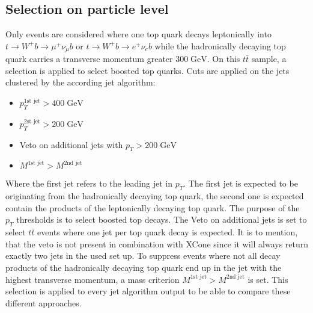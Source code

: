 \subsection{Selection on particle level}
\label{sec:GenSel}
	Only events are considered where one top quark decays leptonically into $t\rightarrow W^{+} b\rightarrow \mu^{+} \nu_{\mu} b$ or $t\rightarrow W^{+} b\rightarrow e^{+} \nu_e b$ while the hadronically decaying top quark carries a transverse momentum greater $300\;\text{GeV}$. On this $t\bar{t}$ sample, a selection is applied to select boosted top quarks. Cuts are applied on the jets clustered by the according jet algorithm:
	\begin{itemize}
	\item $p_T^{\text{1st jet}} > 400\;\text{GeV}$ 
	\item $p_T^{\text{2st jet}} > 200\;\text{GeV}$ 
	\item Veto on additional jets with $p_T > 200\;\text{GeV}$ 
	\item $M^{\text{1st jet}} > M^{\text{2nd jet}}$
	\end{itemize}
	Where the first jet refers to the leading jet in $p_T$. The first jet is expected to be originating from the hadronically decaying top quark, the second one is expected contain the products of the leptonically decaying top quark. The purpose of the $p_T$ thresholds is to select boosted top decays. The Veto on additional jets is set to select $t\bar{t}$ events where one jet per top quark decay is expected. It is to mention, that the veto is not present in combination with XCone since it will always return exactly two jets in the used set up. To suppress events where not all decay products of the hadronically decaying top quark end up in the jet with the highest transverse momentum, a mass criterion $M^{\text{1st jet}} > M^{\text{2nd jet}}$ is set. This selection is applied to every jet algorithm output to be able to compare these different approaches.
	
	
